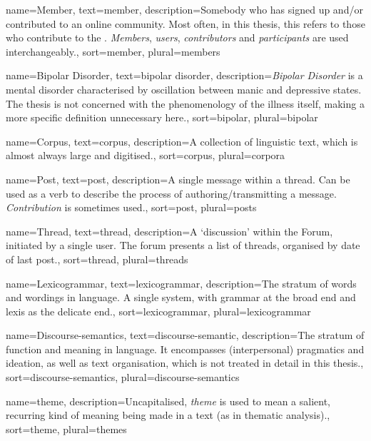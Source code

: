 {
  name=Member,
  text=member,
  description={Somebody who has signed up and\slash or contributed to an online community. Most often, in this thesis, this refers to those who contribute to the . \emph{Members}, \emph{users}, \emph{contributors} and \emph{participants} are used interchangeably.},
  sort=member,
  plural=members
}

{
  name=Bipolar Disorder,
  text=bipolar disorder,
  description={\emph{Bipolar Disorder} is a mental disorder characterised by oscillation between manic and depressive states. The thesis is not concerned with the phenomenology of the illness itself, making a more specific definition unnecessary here.},
  sort=bipolar,
  plural=bipolar
}

{
  name=Corpus,
  text=corpus,
  description={A collection of linguistic text, which is almost always large and digitised.},
  sort=corpus,
  plural=corpora
}

{
  name=Post,
  text=post,
  description={A single message within a \gls{thread}. Can be used as a verb to describe the process of authoring\slash transmitting a message. \emph{Contribution} is sometimes used.},
  sort=post,
  plural=posts
}

{
  name=Thread,
  text=thread,
  description={A `discussion' within the Forum, initiated by a single user. The \gls{forum} presents a list of \glspl{thread}, organised by date of last post.},
  sort=thread,
  plural=threads
}

{
  name=Lexicogrammar,
  text=lexicogrammar,
  description={The stratum of words and wordings in language. A single system, with grammar at the broad end and lexis as the delicate end.},
  sort=lexicogrammar,
  plural=lexicogrammar
}

{
  name=Discourse-semantics,
  text=discourse-semantic,
  description={The stratum of function and meaning in language. It encompasses (interpersonal) pragmatics and ideation, as well as text organisation, which is not treated in detail in this thesis.},
  sort=discourse-semantics,
  plural=discourse-semantics
}

{
  name=theme,
  description={Uncapitalised, \emph{theme} is used to mean a salient, recurring kind of meaning being made in a text (as in thematic analysis).},
  sort=theme,
  plural=themes
}

